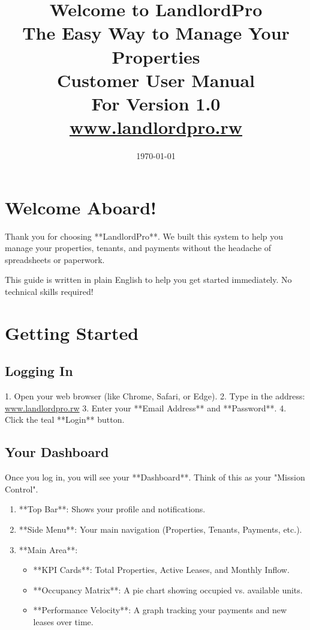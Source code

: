 \documentclass[12pt,a4paper]{article}
\title{
    \vspace{2cm}
    \textcolor{brandTeal}{\textbf{\Huge Welcome to LandlordPro}}\\
    \vspace{0.5cm}
    \textcolor{brandGray}{\Large The Easy Way to Manage Your Properties}\\
    \vspace{2cm}
    \textbf{Customer User Manual}\\
    \small For Version 1.0\\
    \vspace{1cm}
    \url{www.landlordpro.rw}
}
\author{}
\date{\today}
\begin{document}
\maketitle
\thispagestyle{empty}
\newpage

\tableofcontents
\newpage

\section{Welcome Aboard!}
Thank you for choosing **LandlordPro**. We built this system to help you manage your properties, tenants, and payments without the headache of spreadsheets or paperwork. 

This guide is written in plain English to help you get started immediately. No technical skills required!

\section{Getting Started}

\subsection{Logging In}
1. Open your web browser (like Chrome, Safari, or Edge).
2. Type in the address: \textcolor{brandTeal}{\url{www.landlordpro.rw}}
3. Enter your **Email Address** and **Password**.
4. Click the teal **Login** button.

\subsection{Your Dashboard}
Once you log in, you will see your **Dashboard**. Think of this as your "Mission Control".
\begin{enumerate}
    \item **Top Bar**: Shows your profile and notifications.
    \item **Side Menu**: Your main navigation (Properties, Tenants, Payments, etc.).
    \item **Main Area**: 
    \begin{itemize}
        \item **KPI Cards**: Total Properties, Active Leases, and Monthly Inflow.
        \item **Occupancy Matrix**: A pie chart showing occupied vs. available units.
        \item **Performance Velocity**: A graph tracking your payments and new leases over time.
    \end{itemize}
\end{enumerate}
\end{document}
